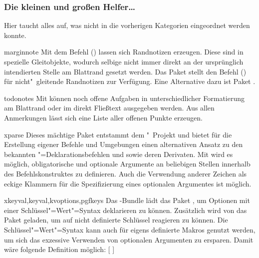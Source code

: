 \subsubsection{Die kleinen und großen Helfer\dots}
Hier taucht alles auf, was nicht in die vorherigen Kategorien eingeordnet 
werden konnte.
%
\begin{packages}
\item[marginnote]
  Mit dem Befehl () lassen sich 
  Randnotizen erzeugen. Diese sind in  spezielle Gleitobjekte, 
  wodurch selbige nicht immer direkt an der ursprünglich intendierten Stelle am 
  Blattrand gesetzt werden. Das Paket  stellt den Befehl 
  () für nicht"~gleitende Randnotizen zur 
  Verfügung. Eine Alternative dazu ist Paket .
\item[todonotes]
  Mit  können noch offene Aufgaben in unterschiedlicher 
  Formatierung am Blattrand oder im direkt Fließtext ausgegeben werden. Aus 
  allen Anmerkungen lässt sich eine Liste aller offenen Punkte erzeugen.
\item[xparse]
  Dieses mächtige Paket entstammt dem "~Projekt und bietet für 
  die Erstellung eigener Befehle und Umgebungen einen alternativen Ansatz zu 
  den bekannten "=Deklarationsbefehlen  und 
   sowie deren Derivaten. Mit  wird es 
  möglich, obligatorische und optionale Argumente an beliebigen Stellen 
  innerhalb des Befehlskonstruktes zu definieren. Auch die Verwendung anderer 
  Zeichen als eckige Klammern für die Spezifizierung eines optionalen 
  Argumentes ist möglich.
\item[xkeyval,keyval,kvoptions,pgfkeys]
  Das \KOMAScript-Bundle lädt das Paket , um Optionen mit 
  einer Schlüssel"=Wert"=Syntax deklarieren zu können. Zusätzlich wird von 
  \TUDScript das Paket  geladen, um auf nicht definierte 
  Schlüssel reagieren zu können. Die Schlüssel"=Wert"=Syntax kann auch für 
  eigens definierte Makros genutzt werden, um sich das exzessive Verwenden von 
  optionalen Argumenten zu ersparen. Damit wäre folgende Definition möglich:
  [%
  ]%
  

\end{packages}
